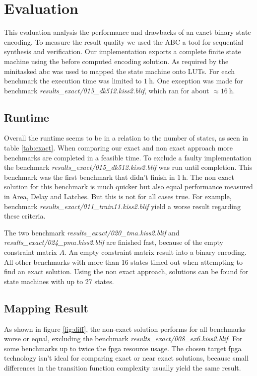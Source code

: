 \chapter{Evaluation}

\label{cha:evaluation}

This evaluation analysis the performance and drawbacks of an exact binary state encoding. To measure the result quality we used the ABC a tool for sequential synthesis and verification. Our implementation exports a complete finite state machine using the before computed encoding solution. As required by the minitasked abc was used to mapped the state machine onto LUTs. For each benchmark the execution time was limited to $\SI{1}{\hour}$. One exception was made for benchmark \textit{results\_exact/015\_dk512.kiss2.blif}, which ran for about $\approx \SI{16}{\hour}$.

\section{Runtime}

Overall the runtime seems to be in a relation to the number of states, as seen in table \ref{tab:exact}. When comparing our exact and non exact approach more benchmarks are completed in a feasible time. To exclude a faulty implementation the benchmark \textit{results\_exact/015\_dk512.kiss2.blif} was run until completion. This benchmark was the first benchmark that didn't finish in $\SI{1}{\hour}$. The non exact solution for this benchmark is much quicker but also equal performance measured in Area, Delay and Latches. But this is not for all cases true. For example, benchmark \textit{results\_exact/011\_train11.kiss2.blif} yield a worse result regarding these criteria.


The two benchmark \textit{results\_exact/020\_tma.kiss2.blif} and \textit{results\_exact/024\_pma.kiss2.blif} are finished fast, because of the empty constraint matrix $A$. An empty constraint matrix result into a binary encoding. All other benchmarks with more than 16 states timed out when attempting to find an exact solution. Using the non exact approach, solutions can be found for state machines with up to 27 states.

\section{Mapping Result}

As shown in figure \ref{fig:diff}, the non-exact solution performs for all benchmarks worse or equal, excluding the benchmark \textit{results\_exact/008\_ex6.kiss2.blif}. For some benchmarks up to twice the fpga resource usage. The chosen target fpga technology isn't ideal for comparing exact or near exact solutions, because small differences in the transition function complexity usually yield the same result.

